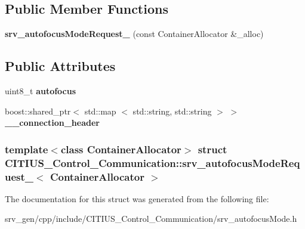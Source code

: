 \subsection*{\-Public \-Member \-Functions}
\begin{DoxyCompactItemize}
\item 
\hypertarget{struct_c_i_t_i_u_s___control___communication_1_1srv__autofocus_mode_request___adfe54743a27d454a073f8cc7a82258a4}{{\bfseries srv\-\_\-autofocus\-Mode\-Request\-\_\-} (const \-Container\-Allocator \&\-\_\-alloc)}\label{struct_c_i_t_i_u_s___control___communication_1_1srv__autofocus_mode_request___adfe54743a27d454a073f8cc7a82258a4}

\end{DoxyCompactItemize}
\subsection*{\-Public \-Attributes}
\begin{DoxyCompactItemize}
\item 
\hypertarget{struct_c_i_t_i_u_s___control___communication_1_1srv__autofocus_mode_request___a6c400f5e81e05a8e84c17ba04c330980}{uint8\-\_\-t {\bfseries autofocus}}\label{struct_c_i_t_i_u_s___control___communication_1_1srv__autofocus_mode_request___a6c400f5e81e05a8e84c17ba04c330980}

\item 
\hypertarget{struct_c_i_t_i_u_s___control___communication_1_1srv__autofocus_mode_request___a44e4644a39d9a949b96663f2cadfb4ef}{boost\-::shared\-\_\-ptr$<$ std\-::map\*
$<$ std\-::string, std\-::string $>$ $>$ {\bfseries \-\_\-\-\_\-connection\-\_\-header}}\label{struct_c_i_t_i_u_s___control___communication_1_1srv__autofocus_mode_request___a44e4644a39d9a949b96663f2cadfb4ef}

\end{DoxyCompactItemize}
\subsubsection*{template$<$class Container\-Allocator$>$ struct C\-I\-T\-I\-U\-S\-\_\-\-Control\-\_\-\-Communication\-::srv\-\_\-autofocus\-Mode\-Request\-\_\-$<$ Container\-Allocator $>$}



\-The documentation for this struct was generated from the following file\-:\begin{DoxyCompactItemize}
\item 
srv\-\_\-gen/cpp/include/\-C\-I\-T\-I\-U\-S\-\_\-\-Control\-\_\-\-Communication/srv\-\_\-autofocus\-Mode.\-h\end{DoxyCompactItemize}
